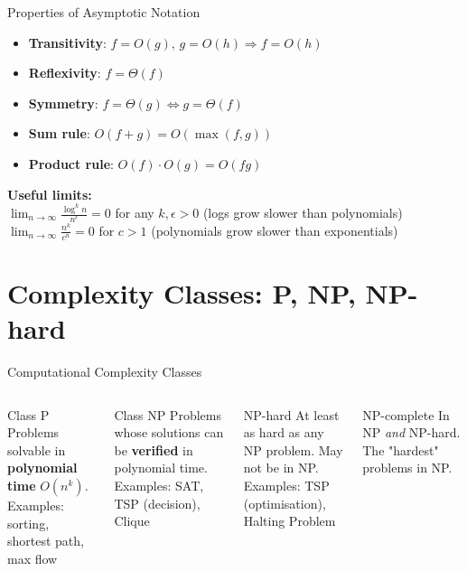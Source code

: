 \documentclass[aspectratio=169,xcolor=dvipsnames]{beamer}
\begin{document}
\begin{frame}{Properties of Asymptotic Notation}
  \begin{itemize}
    \item \textbf{Transitivity}: $f = O(g),\, g = O(h) \Rightarrow f = O(h)$
    \item \textbf{Reflexivity}: $f = \Theta(f)$
    \item \textbf{Symmetry}: $f = \Theta(g) \Leftrightarrow g = \Theta(f)$
    \item \textbf{Sum rule}: $O(f + g) = O(\max(f, g))$
    \item \textbf{Product rule}: $O(f) \cdot O(g) = O(fg)$
  \end{itemize}
  \vspace{0.5em}
  \textbf{Useful limits:}\\
  $\lim_{n\to\infty} \frac{\log^k n}{n^\epsilon} = 0$ for any $k, \epsilon > 0$ (logs grow slower than polynomials)\\
  $\lim_{n\to\infty} \frac{n^k}{c^n} = 0$ for $c > 1$ (polynomials grow slower than exponentials)
\end{frame}

\section{Complexity Classes: P, NP, NP-hard}
\begin{frame}{Computational Complexity Classes}
  \begin{columns}
    \begin{block}{Class P}
      Problems solvable in \textbf{polynomial time} $O(n^k)$.\\
      Examples: sorting, shortest path, max flow
    \end{block}
    \begin{block}{Class NP}
      Problems whose solutions can be \textbf{verified} in polynomial time.\\
      Examples: SAT, TSP (decision), Clique
    \end{block}
    \begin{alertblock}{NP-hard}
      At least as hard as any NP problem. May not be in NP.\\
      Examples: TSP (optimisation), Halting Problem
    \end{alertblock}
    \begin{exampleblock}{NP-complete}
      In NP \emph{and} NP-hard. The "hardest" problems in NP.
    \end{exampleblock}
  \end{columns}
\end{frame}
\end{document}
